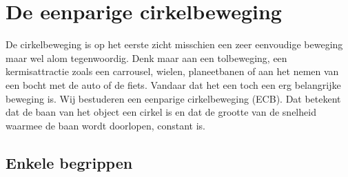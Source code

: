\newpage

\section{De eenparige cirkelbeweging}

De cirkelbeweging is op het eerste zicht misschien een zeer eenvoudige beweging maar wel alom tegenwoordig. Denk maar aan een tolbeweging, een kermisattractie zoals een carrousel, wielen, planeetbanen of aan het nemen van een bocht met de auto of de fiets. Vandaar dat het een toch een erg belangrijke beweging is. Wij bestuderen een eenparige cirkelbeweging (ECB). Dat betekent dat de baan van het object een cirkel is en dat de grootte van de snelheid waarmee de baan wordt doorlopen, constant is.

\subsection{Enkele begrippen}

